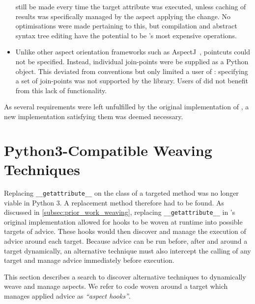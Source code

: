 \begin{itemize}
      still be made every time the target attribute was executed, unless caching
      of results was specifically managed by the aspect applying the change. No
      optimisations were made pertaining to this, but compilation and abstract
      syntax tree editing have the potential to be \pdsf{}'s most expensive
      operations.
    \item Unlike other aspect orientation frameworks such as
      AspectJ~\cite{aspectj_intro}, pointcuts could not be specified. Instead,
      individual join-points were be supplied as a Python object. This deviated
      from \aop{} conventions but only limited a user of \pdsf{}: specifying a
      set of join-points was not supported by the library. Users of \pdsf{} did
      not benefit from this lack of functionality.
\end{itemize}

As several requirements were left unfulfilled by the original implementation of
\pdsf{}, a new implementation satisfying them was deemed necessary.


\section{Python3-Compatible Weaving Techniques}\label{sec:pdsf3python3}

Replacing \lstinline{__getattribute__} on the class of a targeted method was no
longer viable in Python 3. A replacement method therefore had to be found. As
discussed in \cref{subsec:prior_work_weaving}, replacing
\lstinline{__getattribute__} in \pdsf{}'s original implementation allowed for
hooks to be woven at runtime into possible targets of advice. These hooks would
then discover and manage the execution of advice around each target. Because
advice can be run before, after and around a target dynamically, an alternative
technique must also intercept the calling of any target and manage advice
immediately before execution. 

This section describes a search to discover alternative techniques to
dynamically weave and manage aspects. We refer to code woven around a target
which manages applied advice as \emph{``aspect hooks''}.

